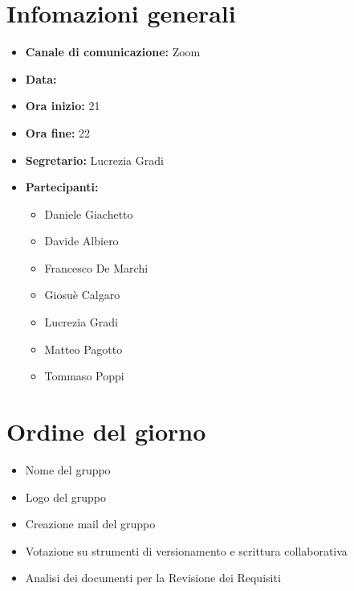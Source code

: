 \section{Infomazioni generali}

\begin{itemize}

	\item \textbf{Canale di comunicazione:} Zoom
	
	\item \textbf{Data:} \DataMeeting{}
	
	\item \textbf{Ora inizio:} 21
	
	\item \textbf{Ora fine:} 22
	
	\item \textbf{Segretario:} Lucrezia Gradi
	
	\item \textbf{Partecipanti:}
	
		\begin{itemize}
		
			\item Daniele Giachetto
			\item Davide Albiero
			\item Francesco De Marchi
			\item Giosuè Calgaro
			\item Lucrezia Gradi
			\item Matteo Pagotto
			\item Tommaso Poppi
				 
		\end{itemize}

\end{itemize}

\section{Ordine del giorno}

\begin{itemize}

	\item Nome del gruppo

	\item Logo del gruppo

	\item Creazione mail del gruppo

	\item Votazione su strumenti di versionamento e scrittura collaborativa
	
	\item Analisi dei documenti per la Revisione dei Requisiti


\end{itemize}

